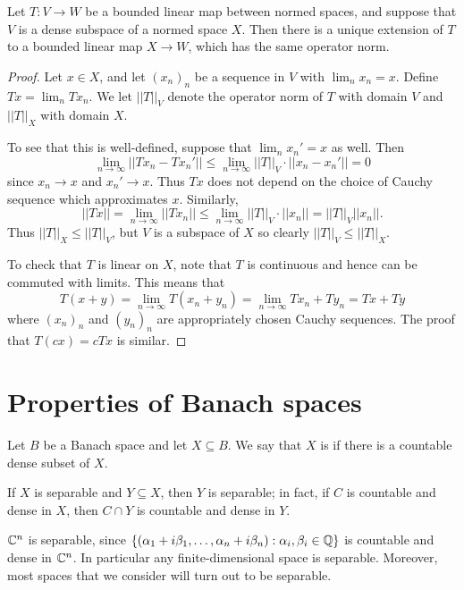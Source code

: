 \begin{lemma}
\label{linear extension}
Let $T: V \to W$ be a bounded linear map between normed spaces, and suppose that $V$ is a dense subspace of a normed space $X$.
Then there is a unique extension of $T$ to a bounded linear map $X \to W$, which has the same operator norm.
\end{lemma}
\begin{proof}
Let $x \in X$, and let $(x_n)_n$ be a sequence in $V$ with $\lim_n x_n = x$.
Define $Tx = \lim_n Tx_n$.
We let $||T||_V$ denote the operator norm of $T$ with domain $V$ and $||T||_X$ with domain $X$.

To see that this is well-defined, suppose that $\lim_n x_n' = x$ as well. Then
$$\lim_{n \to \infty} ||Tx_n - Tx_n'|| \leq \lim_{n \to \infty} ||T||_V \cdot||x_n - x_n'|| = 0$$
since $x_n \to x$ and $x_n' \to x$.
Thus $Tx$ does not depend on the choice of Cauchy sequence which approximates $x$.
Similarly,
$$||Tx|| = \lim_{n \to \infty} ||Tx_n|| \leq \lim_{n \to \infty} ||T||_V \cdot||x_n|| = ||T||_V ||x_n||.$$
Thus $||T||_X \leq ||T||_V$, but $V$ is a subspace of $X$ so clearly $||T||_V \leq ||T||_X$.

To check that $T$ is linear on $X$, note that $T$ is continuous and hence can be commuted with limits. This means that
$$T(x + y) = \lim_{n \to \infty} T(x_n + y_n) = \lim_{n \to \infty} Tx_n + Ty_n = Tx + Ty$$
where $(x_n)_n$ and $(y_n)_n$ are appropriately chosen Cauchy sequences.
The proof that $T(cx) = cTx$ is similar.
\end{proof}

\section{Properties of Banach spaces}
\begin{definition}
Let $B$ be a Banach space and let $X \subseteq B$. We say that $X$ is  if there is a countable dense subset of $X$.
\end{definition}

If $X$ is separable and $Y \subseteq X$, then $Y$ is separable; in fact, if $C$ is countable and dense in $X$, then $C \cap Y$ is countable and dense in $Y$.

\begin{example}
$\mathbb{C}^n$ is separable, since $\{(\alpha_1 + i\beta_1, \dots, \alpha_n + i \beta_n): \alpha_i, \beta_i \in \mathbb{Q}\}$ is countable and dense in $\mathbb{C}^n$.
In particular any finite-dimensional space is separable. Moreover, most spaces that we consider will turn out to be separable.
\end{example}


